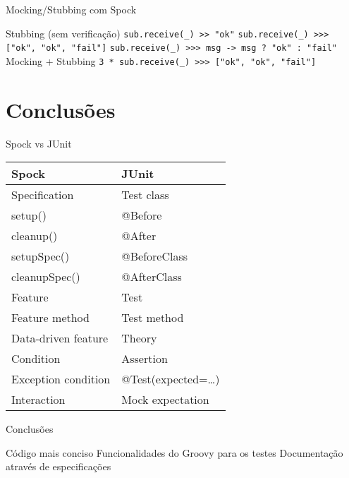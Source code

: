 \documentclass{beamer}
\begin{document}
\begin{frame}{Mocking/Stubbing com Spock}
 \begin{outline}
    Stubbing (sem verificação)
     \texttt{sub.receive(_) >> "ok"}
     \texttt{sub.receive(_) >>> ["ok", "ok", "fail"]}
     \texttt{sub.receive(_) >>> {msg -> msg ? "ok" : "fail"}}
    Mocking + Stubbing
     \texttt{3 * sub.receive(_) >>> ["ok", "ok", "fail"]}
 \end{outline}
\end{frame}

\section{Conclusões}

\begin{frame}{Spock vs JUnit}
  \begin{table}[]
    \begin{tabular}{@{}ll@{}}
      \toprule
      Spock               & JUnit              \\ \midrule
      Specification       & Test class         \\
      setup()             & @Before            \\
      cleanup()           & @After             \\
      setupSpec()         & @BeforeClass       \\
      cleanupSpec()       & @AfterClass        \\
      Feature             & Test               \\
      Feature method      & Test method        \\
      Data-driven feature & Theory             \\
      Condition           & Assertion          \\
      Exception condition & @Test(expected=…​)  \\
      Interaction         & Mock expectation   \\ \bottomrule
    \end{tabular}
  \end{table}
\end{frame}

\begin{frame}{Conclusões}
 \begin{outline}
    Código mais conciso
    Funcionalidades do Groovy para os testes
    Documentação através de especificações
 \end{outline}
\end{frame}
\end{document}
